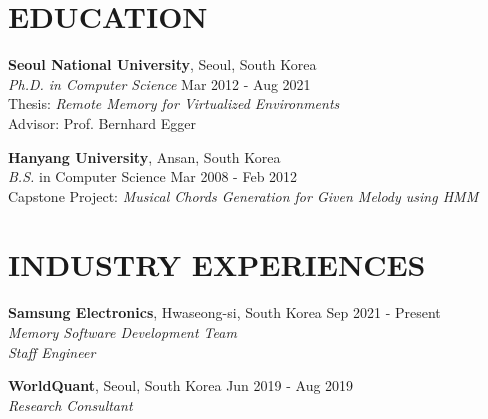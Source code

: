\documentclass[margin]{res}
\begin{document}
\begin{resume}


\section{EDUCATION}
\textbf{Seoul National University}, Seoul, South Korea \\
{\sl Ph.D. in Computer Science} \hfill Mar 2012 - Aug 2021 \\
Thesis: \textit{Remote Memory for Virtualized Environments} \\
Advisor: Prof. Bernhard Egger

\vspace{-0.5em}
\textbf{Hanyang University}, Ansan, South Korea \\
{\sl B.S.} in Computer Science \hfill Mar 2008 - Feb 2012 \\
Capstone Project: \textit{Musical Chords Generation for Given Melody using HMM} \\


\vspace{-1.5em}
\section{INDUSTRY EXPERIENCES}
\par
\textbf{Samsung Electronics}, Hwaseong-si, South Korea \hfill Sep 2021 - Present \\
\textit{Memory Software Development Team} \\
\textit{Staff Engineer} \\

\vspace{-1.5em}
\par
\textbf{WorldQuant}, Seoul, South Korea \hfill Jun 2019 - Aug 2019 \\
\textit{Research Consultant} \\



\end{resume}
\end{document}
